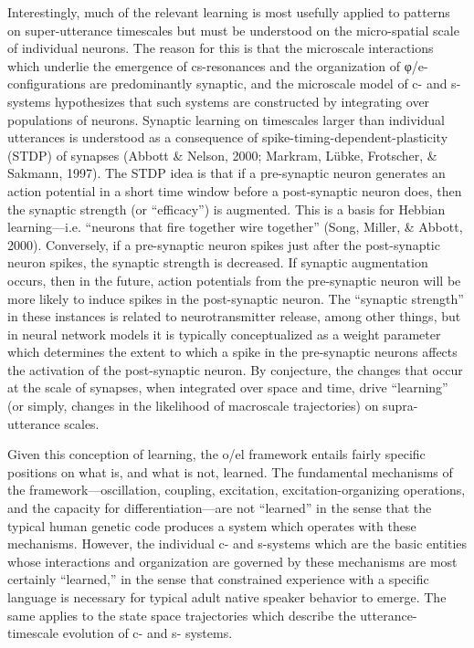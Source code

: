Interestingly, much of the relevant learning is most usefully applied to patterns on super-utterance timescales but must be understood on the micro-spatial scale of individual neurons. The reason for this is that the microscale interactions which underlie the emergence of cs-resonances and the organization of φ/e-configurations are predominantly synaptic, and the microscale model of c- and s- systems hypothesizes that such systems are constructed by integrating over populations of neurons. Synaptic learning on timescales larger than individual utterances is understood as a consequence of spike-timing-dependent-plasticity (STDP) of synapses (Abbott \& Nelson, 2000; Markram, Lübke, Frotscher, \& Sakmann, 1997). The STDP idea is that if a pre-synaptic neuron generates an action potential in a short time window before a post-synaptic neuron does, then the synaptic strength (or “efficacy”) is augmented. This is a basis for Hebbian learning—i.e. “neurons that fire together wire together” (Song, Miller, \& Abbott, 2000). Conversely, if a pre-synaptic neuron spikes just after the post-synaptic neuron spikes, the synaptic strength is decreased. If synaptic augmentation occurs, then in the future, action potentials from the pre-synaptic neuron will be more likely to induce spikes in the post-synaptic neuron. The “synaptic strength” in these instances is related to neurotransmitter release, among other things, but in neural network models it is typically conceptualized as a weight parameter which determines the extent to which a spike in the pre-synaptic neurons affects the activation of the post-synaptic neuron. By conjecture, the changes that occur at the scale of synapses, when integrated over space and time, drive “learning” (or simply, changes in the likelihood of macroscale trajectories) on supra-utterance scales. 

  Given this conception of learning, the o/el framework entails fairly specific positions on what is, and what is not, learned. The fundamental mechanisms of the framework—oscillation, coupling, excitation, excitation-organizing operations, and the capacity for differentiation—are not “learned” in the sense that the typical human genetic code produces a system which operates with these mechanisms. However, the individual c- and s-systems which are the basic entities whose interactions and organization are governed by these mechanisms are most certainly “learned,” in the sense that constrained experience with a specific language is necessary for typical adult native speaker behavior to emerge. The same applies to the state space trajectories which describe the utterance-timescale evolution of c- and s- systems.

